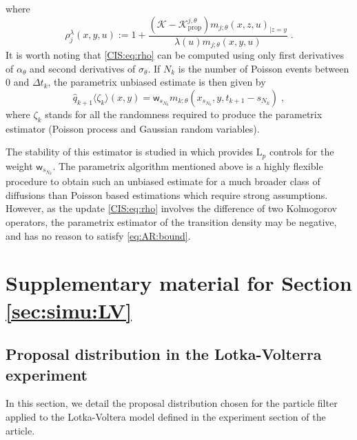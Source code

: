 \documentclass[12pt]{article}
\newcommand{\parvec}{\theta}
\newcommand{\hdhat}[1]{\widehat{q}_{#1}}
\newcommand{\eqdef}{\ensuremath{:=}}
\newcommand{\eqsp}{\;}
\begin{document}
where
\begin{equation}
\label{CIS:eq:rho}
\rho^{\lambda}_j\left(x,y,u\right)\eqdef 1+\frac{\left(\mathcal{K}-\mathcal{K}^{j,\theta}_{\mathrm{prop}}\right)m_{j;\parvec}\left(x,z,u\right)_{|z=y}}{\lambda(u)m_{j;\parvec}\left(x,y,u\right)}\eqsp.
\end{equation}
It is worth noting that \eqref{CIS:eq:rho} can be computed using only first derivatives of $\alpha_{\parvec}$ and second derivatives of $\sigma_\parvec$. 
If $N_k$ is the number of Poisson events between $0$ and $\Delta t_{k}$, the parametrix unbiased estimate is then given by 
\[
\hdhat{k+1}\langle \zeta_k\rangle(x,y) = \mathsf{w}_{s_{N_k}}m_{k;\parvec}\left(x_{s_{N_k}},y,t_{k+1} - s_{N_k}\right) \eqsp,
\]
where $\zeta_k$ stands for all the randomness required to produce the parametrix estimator (Poisson process and Gaussian random variables).

The stability of this estimator is studied in \cite{fearnhead2017continuous} which provides $\mathrm{L}_p$ controls for the weight $\mathsf{w}_{s_{N_k}}$. 
The parametrix algorithm mentioned above is a highly flexible procedure to obtain such an unbiased estimate for a much broader class of diffusions than Poisson based estimations which require strong assumptions. 
However, as the update \eqref{CIS:eq:rho} involves the difference of two Kolmogorov operators, the parametrix estimator of the transition density may be negative, and has no reason to satisfy \eqref{eq:AR:bound}.

\section{Supplementary material for Section \ref{sec:simu:LV}}

\subsection*{Proposal distribution in the Lotka-Volterra experiment}

In this section, we detail the proposal distribution chosen for the particle filter applied to the Lotka-Voltera model defined in the experiment section of the article. 
\end{document}
